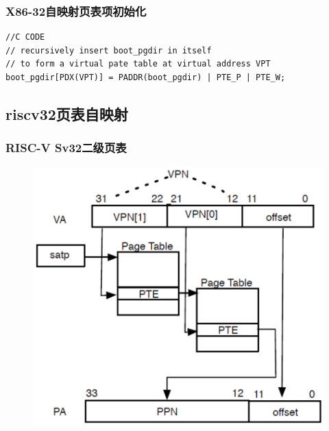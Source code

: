 % 
\begin{frame}
    \frametitle{X86-32自映射页表项初始化}
    \begin{block}{}
    \begin{verbatim}
//C CODE
// recursively insert boot_pgdir in itself
// to form a virtual pate table at virtual address VPT
boot_pgdir[PDX(VPT)] = PADDR(boot_pgdir) | PTE_P | PTE_W;
    \end{verbatim}
    \end{block}
\end{frame}
\subsection{riscv32页表自映射} %
\begin{frame}
    \frametitle{RISC-V Sv32二级页表}
    \begin{figure}
    \includegraphics[width=0.5\linewidth]{figs/riscv32-pagetable.png}
    \end{figure}
\end{frame}

